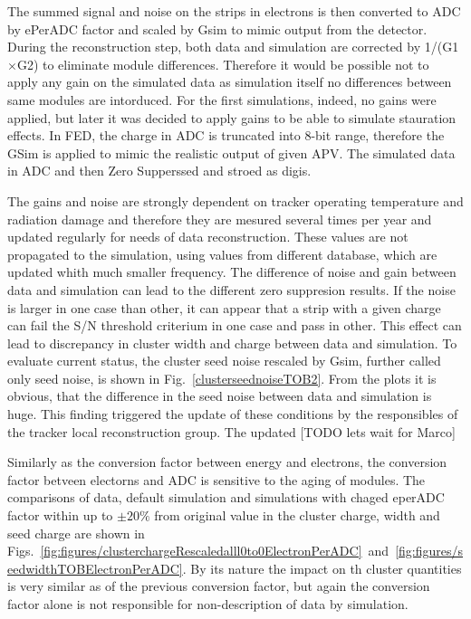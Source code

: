  The summed signal and noise on the strips in electrons is then converted to ADC by ePerADC factor and scaled by Gsim to mimic output from the detector. During the reconstruction step, both data and simulation are corrected by 1/(G1$\times$G2) to eliminate module differences. Therefore it would be possible not to apply any gain on the simulated data as simulation itself no differences between same modules are intorduced. For the first simulations, indeed, no gains were applied, but later it was decided to apply gains to be able to simulate stauration effects. In FED, the charge in ADC is truncated into 8-bit range, therefore the GSim is applied to mimic the realistic output of given APV. The simulated data in ADC and then Zero Supperssed and stroed as digis.
 

The gains and noise are strongly dependent on tracker operating temperature and radiation damage and therefore they are mesured several times per year and updated regularly for needs of data reconstruction. These values are not propagated to the simulation, using values from different database, which are updated whith much smaller frequency. The difference of noise and gain between data and simulation can lead to the different zero suppresion results. If the noise is larger in one case than other, it can appear that a strip with a given charge can fail the S/N threshold criterium in one case and pass in other. This effect can lead to discrepancy in cluster width and charge between data and simulation. To evaluate current status, the cluster seed noise rescaled by Gsim, further called only seed noise, is shown in Fig.~\ref{clusterseednoiseTOB2}. From the plots it is obvious, that the difference in the seed noise between data and simulation is huge. This finding triggered the update of these conditions by the responsibles of the tracker local reconstruction group. The updated [TODO lets wait for Marco] 

Similarly as the conversion factor between energy and electrons, the conversion factor betveen electorns and ADC is sensitive to the aging of modules. The comparisons of data, default simulation and simulations with chaged eperADC factor within up to  $\pm 20\%$ from original value in the cluster charge, width and seed charge are shown in Figs.~\ref{fig:figures/clusterchargeRescaledalll0to0ElectronPerADC}~and~\ref{fig:figures/seedwidthTOBElectronPerADC}. By its nature the impact on th cluster quantities is very similar as of the previous conversion factor, but again the conversion factor alone is not responsible for non-description of data by simulation.  


